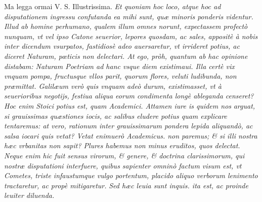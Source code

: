 \documentclass[11pt,twoside,openany]{book}
\begin{document}
\par\bigskip\noindent{}\enspace Ma legga ormai V. S. Illustrissima. \textit{Et quoniam hoc loco, atque hoc ad disputationem ingressu confutanda ea mihi sunt, quæ minoris ponderis videntur. Illud ab homine perhumano, qualem illum omnes norunt, expectassem profectò nunquam, vt vel ipso Catone seuerior, lepores quosdam, ac sales, appositè à nobis inter dicendum vsurpatos, fastidiosè adeo auersaretur, vt irrideret potius, ac diceret Naturam, pœticis non delectari. At ego, pròh, quantum ab hac opinione distabam: Naturam Poetriam ad hanc vsque diem existimaui. Illa certè vix vnquam pompa, fructusque vllos parit, quorum flores, veluti ludibunda, non præmittat. Galilæum verò quis vnquam adeò durum, existimasset, vt à seuerioribus negotijs, festiua aliqua eorum condimenta longè ableganda censeret? Hoc enim Stoici potius est, quam Academici. Attamen iure is quidem nos }\textit{arguat, si grauissimas quæstiones iocis, ac salibus eludere potius quam explicare tentaremus: at vero, rationum inter grauissimarum pondera lepida aliquandò, ac salsa iocari quis vetat? Vetat enimuerò Academicus. non paremus; \& si illi nostra hæc vrbanitas non sapit? Plures habemus non minus eruditos, quos delectat. Neque enim hic fuit sensus virorum, \& genere, \& doctrina clarissimorum, qui nostræ disputationi interfuere, quibus sapienter omninò factum visum est, vt Cometes, triste infaustumque vulgo portentum, placido aliquo verborum lenimento tractaretur, ac propè mitigaretur. }\textit{Sed hæc leuia sunt inquis. ita est, ac proinde leuiter diluenda.}
\end{document}
